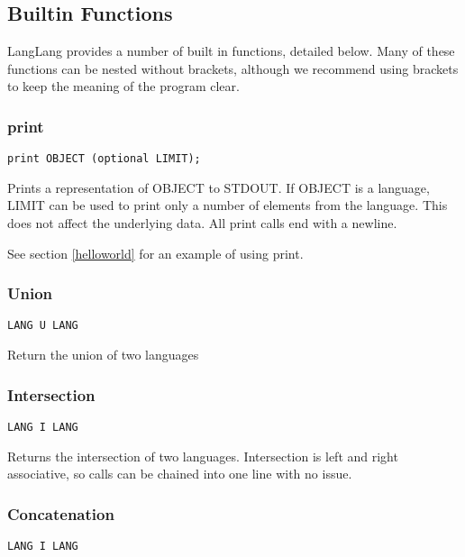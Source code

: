 \subsection{Builtin Functions}
\label{builtins}
\begin{normalsize}
LangLang provides a number of built in functions, detailed below. Many of these functions can be nested without brackets, although we recommend using brackets to keep the meaning of the program clear.
\end{normalsize}

\subsubsection{print}
\label{print}
\begin{verbatim}
print OBJECT (optional LIMIT);
\end{verbatim}
\begin{normalsize}
Prints a representation of OBJECT to STDOUT. If OBJECT is a language, LIMIT can be used to print only a number of elements from the language. This does not affect the underlying data. All print calls end with a newline.

See section \ref{helloworld} for an example of using print.
\end{normalsize}

\subsubsection{Union}
\begin{verbatim}
LANG U LANG
\end{verbatim}
\begin{normalsize}
Return the union of two languages
\end{normalsize}

\subsubsection{Intersection}
\begin{verbatim}
LANG I LANG
\end{verbatim}
\begin{normalsize}
Returns the intersection of two languages. Intersection is left and right associative, so calls can be chained into one line with no issue.
\end{normalsize}

\subsubsection{Concatenation}
\begin{verbatim}
LANG I LANG
\end{verbatim}
\begin{normalsize}

\end{normalsize}

